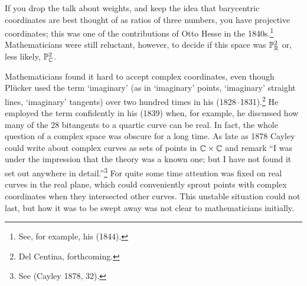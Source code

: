 If you drop the talk about weights, and keep the idea that barycentric coordinates are best thought of as ratios of three numbers, you have projective coordinates; this was one of the contributions of Otto Hesse in the 1840s.\footnote{See, for example, his (1844).}
Mathematicians were still reluctant, however, to decide if this space was $\PP_\RR^2$ or, less likely, $\PP_\CC^2$. 
 


Mathematicians found it  hard to accept complex coordinates,  even though Pl\"ucker used the term `imaginary'  (as in `imaginary' points, `imaginary' straight lines, `imaginary' tangents) over two hundred times in his   (1828--1831).\footnote{Del Centina, forthcoming.} He employed the term confidently in his (1839) when, for example, he discussed how many of the 28 bitangents to a quartic curve can be real. In fact, the whole question of a complex space was obscure for a long time. As late as 1878 Cayley could write about complex curves as sets of points in $\CC \times \CC$ and remark ``I was under the impression that the theory was a known one; but I have not found it set out anywhere in detail.''\footnote{See (Cayley 1878, 32).} For quite some time attention was fixed on real curves in the real plane, which could conveniently sprout points with complex coordinates when they intersected other curves. This unstable situation could not last, but how it was to be swept away was not clear to mathematicians initially. 


